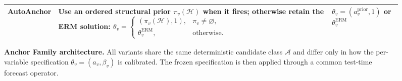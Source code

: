 \documentclass{article}
\begin{document}
\begin{figure}[t]
{\begin{minipage}{0.96\textwidth}
\begin{tabular}{p{}|p{}|p{}}
\textbf{AutoAnchor}
& Use an ordered structural prior $\pi_v(\mathcal H)$ when it fires; otherwise
retain the ERM solution:
$\displaystyle
\theta_v=
\begin{cases}
(\pi_v(\mathcal H),1),&\pi_v\neq\varnothing,\\
\theta_v^{\mathrm{ERM}},&\text{otherwise.}
\end{cases}$
& $\theta_v=(a_v^{\mathrm{prior}},1)$ or
$\theta_v^{\mathrm{ERM}}$ \\
\bottomrule
\end{tabular}

\vspace{0.55em}


\end{minipage}%
}

\caption{\textbf{Anchor Family architecture.}
All variants share the same deterministic candidate class $\mathcal A$ and
differ only in how the per-variable specification
$\theta_v=(a_v,\beta_v)$ is calibrated. The frozen specification is then
applied through a common test-time forecast operator.}
\label{fig:anchor-family-architecture}
\end{figure}
\end{document}
